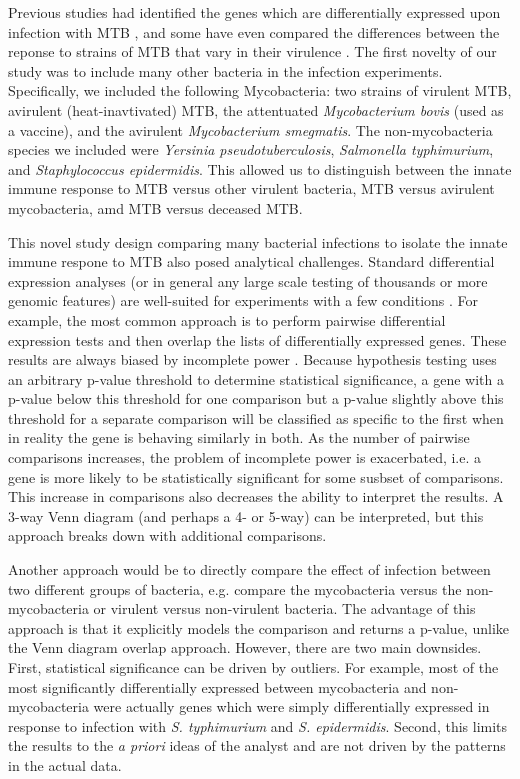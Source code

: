 Previous studies had identified the genes which
are differentially expressed upon infection with MTB
\citep{Ehrt2001, Ragno2001, Nau2002, Chaussabel2003, Volpe2006, Tailleux2008}, and some have
even compared the differences between the reponse to strains of MTB
that vary in their virulence \citep{Coscolla2010, Wu2012}. The first novelty of our study was to
include many other bacteria in the infection experiments. Specifically, we
included the following Mycobacteria: two strains of virulent MTB,
avirulent (heat-inavtivated) MTB, the attentuated \emph{Mycobacterium
  bovis} (used as a vaccine), and the avirulent \emph{Mycobacterium
  smegmatis}. The non-mycobacteria species we included were
\emph{Yersinia pseudotuberculosis}, \emph{Salmonella typhimurium}, and
\emph{Staphylococcus epidermidis}. This allowed us to distinguish
between the innate immune response to MTB versus other virulent
bacteria, MTB versus avirulent mycobacteria, amd MTB versus deceased
MTB.

This novel study design comparing many bacterial infections to isolate
the innate immune respone to MTB also posed analytical
challenges. Standard differential expression analyses (or in general
any large scale testing of thousands or more genomic features) are
well-suited for experiments with a few conditions \citep{Oshlack2010, Anders2013, Ritchie2015}. For example, the
most common approach is to perform pairwise differential expression
tests and then overlap the lists of differentially expressed
genes. These results are always biased by incomplete power \citep{Ding2010, Flutre2013}. Because
hypothesis testing uses an arbitrary p-value threshold to determine
statistical significance, a gene with a p-value below this threshold
for one comparison but a p-value slightly above this threshold for a
separate comparison will be classified as specific to the first when
in reality the gene is behaving similarly in both. As the number of
pairwise comparisons increases, the problem of incomplete power is
exacerbated, i.e. a gene is more likely to be statistically
significant for some susbset of comparisons. This increase in
comparisons also decreases the ability to interpret the results. A
3-way Venn diagram (and perhaps a 4- or 5-way) can be interpreted, but
this approach breaks down with additional comparisons.

Another approach would be to directly compare the effect of infection between
two different groups of bacteria, e.g. compare the mycobacteria versus the
non-mycobacteria or virulent versus non-virulent bacteria. The advantage of this
approach is that it explicitly models the comparison and returns a p-value,
unlike the Venn diagram overlap approach. However, there are two main
downsides. First, statistical significance can be driven by outliers. For
example, most of the most significantly differentially expressed between
mycobacteria and non-mycobacteria were actually genes which were simply
differentially expressed in response to infection with \emph{S. typhimurium} and
\emph{S. epidermidis}. Second, this limits the results to the \emph{a priori}
ideas of the analyst and are not driven by the patterns in the actual data.

